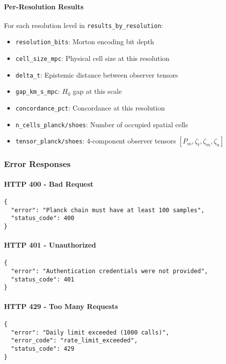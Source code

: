 \documentclass[11pt]{article}
\begin{document}
\paragraph{Per-Resolution Results}
For each resolution level in \texttt{results\_by\_resolution}:
\begin{itemize}
    \item \texttt{resolution\_bits}: Morton encoding bit depth
    \item \texttt{cell\_size\_mpc}: Physical cell size at this resolution
    \item \texttt{delta\_t}: Epistemic distance between observer tensors
    \item \texttt{gap\_km\_s\_mpc}: $H_0$ gap at this scale
    \item \texttt{concordance\_pct}: Concordance at this resolution
    \item \texttt{n\_cells\_planck/shoes}: Number of occupied spatial cells
    \item \texttt{tensor\_planck/shoes}: 4-component observer tensors $[P_m, \zeta_t, \zeta_m, \zeta_a]$
\end{itemize}

\subsubsection{Error Responses}

\paragraph{HTTP 400 - Bad Request}
\begin{lstlisting}[style=json]
{
  "error": "Planck chain must have at least 100 samples",
  "status_code": 400
}
\end{lstlisting}

\paragraph{HTTP 401 - Unauthorized}
\begin{lstlisting}[style=json]
{
  "error": "Authentication credentials were not provided",
  "status_code": 401
}
\end{lstlisting}

\paragraph{HTTP 429 - Too Many Requests}
\begin{lstlisting}[style=json]
{
  "error": "Daily limit exceeded (1000 calls)",
  "error_code": "rate_limit_exceeded",
  "status_code": 429
}
\end{lstlisting}
\end{document}
